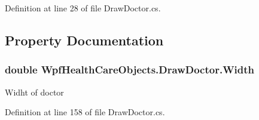 Definition at line 28 of file Draw\+Doctor.\+cs.



\subsection{Property Documentation}
\subsubsection[{\texorpdfstring{Width}{Width}}]{\setlength{\rightskip}{0pt plus 5cm}double Wpf\+Health\+Care\+Objects.\+Draw\+Doctor.\+Width\hspace{0.3cm}{\ttfamily [get]}}\hypertarget{class_wpf_health_care_objects_1_1_draw_doctor_a4b02889c837ab580d88947d5fd31b744}{}\label{class_wpf_health_care_objects_1_1_draw_doctor_a4b02889c837ab580d88947d5fd31b744}


Widht of doctor 



Definition at line 158 of file Draw\+Doctor.\+cs.

